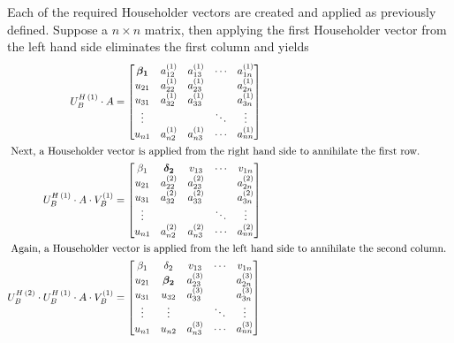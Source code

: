 Each of the required Householder vectors are created and applied as
previously defined.  Suppose a $n\times n$ matrix, then applying the
first Householder vector from the left hand side eliminates the first
column and yields
\begin{align}
U_B^{H\,(1)} \cdot A &=
\begin{bmatrix}
\boldsymbol{\beta_1} & a_{12}^{(1)} & a_{13}^{(1)} & \cdots & a_{1n}^{(1)} \\
u_{21} & a_{22}^{(1)} & a_{23}^{(1)} &  & a_{2n}^{(1)} \\
u_{31} & a_{32}^{(1)} & a_{33}^{(1)} &  & a_{3n}^{(1)} \\
\vdots &  & & \ddots & \vdots \\
u_{n1} & a_{n2}^{(1)} & a_{n3}^{(1)} & \cdots & a_{nn}^{(1)} \\
\end{bmatrix}\\
\intertext{
Next, a Householder vector is applied from the right hand side to
annihilate the first row.
}
U_B^{H\,(1)} \cdot A \cdot V_B^{(1)} &=
\begin{bmatrix}
\beta_1 & \boldsymbol{\delta_2} & v_{13} & \cdots & v_{1n} \\
u_{21} & a_{22}^{(2)} & a_{23}^{(2)} &  & a_{2n}^{(2)} \\
u_{31} & a_{32}^{(2)} & a_{33}^{(2)} &  & a_{3n}^{(2)} \\
\vdots &  & & \ddots & \vdots \\
u_{n1} & a_{n2}^{(2)} & a_{n3}^{(2)} & \cdots & a_{nn}^{(2)} \\
\end{bmatrix}\\
\intertext{
Again, a Householder vector is applied from the left hand side to
annihilate the second column.
}
U_B^{H\,(2)} \cdot U_B^{H\,(1)} \cdot A \cdot V_B^{(1)} &=
\begin{bmatrix}
\beta_1 & \delta_2 & v_{13} & \cdots & v_{1n} \\
u_{21} & \boldsymbol{\beta_2} & a_{23}^{(3)} &  & a_{2n}^{(3)} \\
u_{31} & u_{32} & a_{33}^{(3)} &  & a_{3n}^{(3)} \\
\vdots & \vdots & & \ddots & \vdots \\
u_{n1} & u_{n2} & a_{n3}^{(3)} & \cdots & a_{nn}^{(3)} \\

\end{bmatrix}
\end{align}
